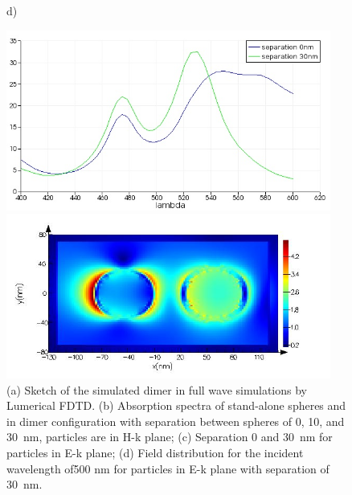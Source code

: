 \documentclass[a4paper]{article}
\begin{document}
\begin{figure}
\begin{minipage}[h]{0.49\textwidth}
  \end{minipage}
  \begin{minipage}[h]{0.49\textwidth}    \begin{flushleft}     d)   \end{flushleft}
  \end{minipage}
  \begin{minipage}[h]{0.49\textwidth} 
    \includegraphics[width=0.95\textwidth]{fdtd-spectra-Ek}
  \end{minipage}
  \begin{minipage}[h]{0.49\textwidth} 
    \includegraphics[width=0.95\textwidth]{fdtd-field}
  \end{minipage}
    \caption{(a) Sketch of the simulated dimer in full wave simulations by Lumerical FDTD. (b)
     Absorption spectra of stand-alone spheres and in dimer configuration with separation between spheres of 0, 10, and
     30~nm, particles are in H-k plane; (c) Separation 0 and 30~nm for
     particles in E-k plane; (d) Field distribution for the incident wavelength of500 nm for particles in E-k plane with separation of 30~nm.\label{fig:fdtd}}%
\end{figure}
\end{document}
